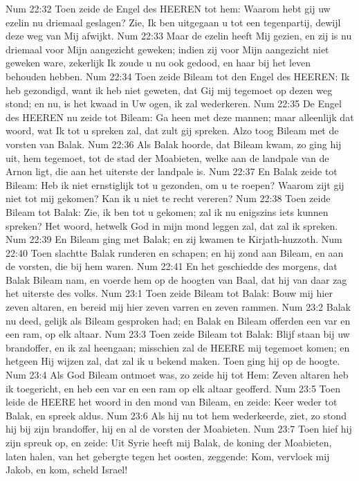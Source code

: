 Num 22:32  Toen zeide de Engel des HEEREN tot hem: Waarom hebt gij uw ezelin nu driemaal geslagen? Zie, Ik ben uitgegaan u tot een tegenpartij, dewijl deze weg van Mij afwijkt.
Num 22:33  Maar de ezelin heeft Mij gezien, en zij is nu driemaal voor Mijn aangezicht geweken; indien zij voor Mijn aangezicht niet geweken ware, zekerlijk Ik zoude u nu ook gedood, en haar bij het leven behouden hebben.
Num 22:34  Toen zeide Bileam tot den Engel des HEEREN: Ik heb gezondigd, want ik heb niet geweten, dat Gij mij tegemoet op dezen weg stond; en nu, is het kwaad in Uw ogen, ik zal wederkeren.
Num 22:35  De Engel des HEEREN nu zeide tot Bileam: Ga heen met deze mannen; maar alleenlijk dat woord, wat Ik tot u spreken zal, dat zult gij spreken. Alzo toog Bileam met de vorsten van Balak.
Num 22:36  Als Balak hoorde, dat Bileam kwam, zo ging hij uit, hem tegemoet, tot de stad der Moabieten, welke aan de landpale van de Arnon ligt, die aan het uiterste der landpale is.
Num 22:37  En Balak zeide tot Bileam: Heb ik niet ernstiglijk tot u gezonden, om u te roepen? Waarom zijt gij niet tot mij gekomen? Kan ik u niet te recht vereren?
Num 22:38  Toen zeide Bileam tot Balak: Zie, ik ben tot u gekomen; zal ik nu enigszins iets kunnen spreken? Het woord, hetwelk God in mijn mond leggen zal, dat zal ik spreken.
Num 22:39  En Bileam ging met Balak; en zij kwamen te Kirjath-huzzoth.
Num 22:40  Toen slachtte Balak runderen en schapen; en hij zond aan Bileam, en aan de vorsten, die bij hem waren.
Num 22:41  En het geschiedde des morgens, dat Balak Bileam nam, en voerde hem op de hoogten van Baal, dat hij van daar zag het uiterste des volks.
Num 23:1  Toen zeide Bileam tot Balak: Bouw mij hier zeven altaren, en bereid mij hier zeven varren en zeven rammen.
Num 23:2  Balak nu deed, gelijk als Bileam gesproken had; en Balak en Bileam offerden een var en een ram, op elk altaar.
Num 23:3  Toen zeide Bileam tot Balak: Blijf staan bij uw brandoffer, en ik zal heengaan; misschien zal de HEERE mij tegemoet komen; en hetgeen Hij wijzen zal, dat zal ik u bekend maken. Toen ging hij op de hoogte.
Num 23:4  Als God Bileam ontmoet was, zo zeide hij tot Hem: Zeven altaren heb ik toegericht, en heb een var en een ram op elk altaar geofferd.
Num 23:5  Toen leide de HEERE het woord in den mond van Bileam, en zeide: Keer weder tot Balak, en spreek aldus.
Num 23:6  Als hij nu tot hem wederkeerde, ziet, zo stond hij bij zijn brandoffer, hij en al de vorsten der Moabieten.
Num 23:7  Toen hief hij zijn spreuk op, en zeide: Uit Syrie heeft mij Balak, de koning der Moabieten, laten halen, van het gebergte tegen het oosten, zeggende: Kom, vervloek mij Jakob, en kom, scheld Israel!
